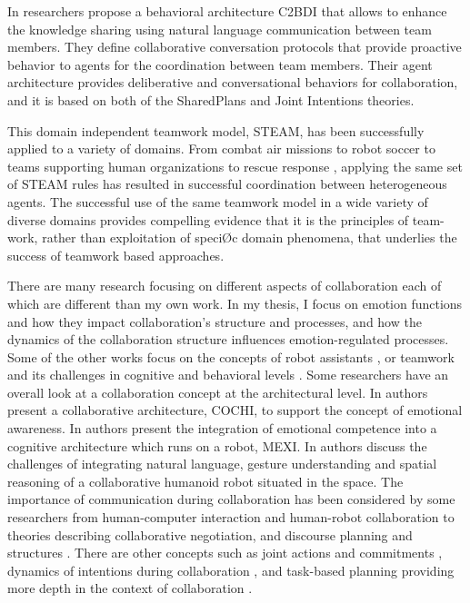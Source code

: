 \documentclass[11pt]{article}
\begin{document}
In \cite{kabil:coordination-mechanisms} researchers propose a behavioral
architecture C2BDI that allows to enhance the knowledge sharing using natural
language communication between team members. They define collaborative
conversation protocols that provide proactive behavior to agents for the
coordination between team members. Their agent architecture provides
deliberative and conversational behaviors for collaboration, and it is based
on both of the SharedPlans and Joint Intentions theories.

This domain independent teamwork model, STEAM, has been successfully applied to
a variety of domains.  From combat air missions
\cite{hill:synthetic-battlefield-aircraft} to robot soccer \cite{kitano:robocup}
to teams supporting human organizations
\cite{pynadath:teamwork-heterogeneous-agents} to rescue response
\cite{scerri:robot-agent-person}, applying the same set of STEAM rules has
resulted in successful coordination between heterogeneous agents. The successful
use of the same teamwork model in a wide variety of diverse domains provides
compelling evidence that it is the principles of team- work, rather than
exploitation of speciØc domain phenomena, that underlies the success of teamwork
based approaches.

There are many research focusing
on different aspects of collaboration each of which are different than my own
work. In my thesis, I focus on emotion functions and how they impact
collaboration's structure and processes, and how the dynamics of the
collaboration structure influences emotion-regulated processes. Some of the
other works focus on the concepts of robot assistants
\cite{clancey:agent-assistants-collaboration}, or teamwork and its challenges in
cognitive and behavioral levels \cite{cohen:teamwork,
nikolaidis:collaboration-joint-action, scerri:prototype-distributed-teams,
tambe:flexible-teamwork}. Some researchers have an overall look at a
collaboration concept at the architectural level. In
\cite{garcia:collaboration-emotional-awareness} authors present a collaborative
architecture, COCHI, to support the concept of emotional awareness. In
\cite{esau:integrating-emotion-collaboration} authors present the integration of
emotional competence into a cognitive architecture which runs on a robot, MEXI.
In \cite{sofge:collaboration-humanoid-space} authors discuss the challenges of
integrating natural language, gesture understanding and spatial reasoning of a
collaborative humanoid robot situated in the space. The importance of
communication during collaboration has been considered by some researchers from
human-computer interaction and human-robot collaboration
\cite{clair:action-intention-collaboraiton,
matignon:verbal-nonverbal-collaboration, rich:discourse} to theories describing
collaborative negotiation, and discourse planning and structures
\cite{andriessen:disourse-planning, grosz:discourse-structure,
sidner:discourse-collaborative-negotiation}. There are other concepts such as
joint actions and commitments \cite{grosz:intention-dynamics-collaboration},
dynamics of intentions during collaboration \cite{levesque:acting-together}, and
task-based planning providing more depth in the context of collaboration
\cite{burghart:cognitive-architecture-robot, rich:cea}.
\end{document}
